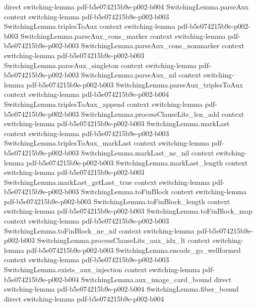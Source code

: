 \begin{lemma}
  {direct}
  {switching-lemma}
  {pdf-b5e074215b9e-p002-b004}
\proofstep
  {SwitchingLemma.parseAux}
  {context}
  {switching-lemma}
  {pdf-b5e074215b9e-p002-b003}
\proofstep
  {SwitchingLemma.triplesToAux}
  {context}
  {switching-lemma}
  {pdf-b5e074215b9e-p002-b003}
\proofstep
  {SwitchingLemma.parseAux_cons_marker}
  {context}
  {switching-lemma}
  {pdf-b5e074215b9e-p002-b003}
\proofstep
  {SwitchingLemma.parseAux_cons_nonmarker}
  {context}
  {switching-lemma}
  {pdf-b5e074215b9e-p002-b003}
\proofstep
  {SwitchingLemma.parseAux_singleton}
  {context}
  {switching-lemma}
  {pdf-b5e074215b9e-p002-b003}
\proofstep
  {SwitchingLemma.parseAux_nil}
  {context}
  {switching-lemma}
  {pdf-b5e074215b9e-p002-b003}
\proofstep
  {SwitchingLemma.parseAux_triplesToAux}
  {context}
  {switching-lemma}
  {pdf-b5e074215b9e-p002-b004}
\proofstep
  {SwitchingLemma.triplesToAux_append}
  {context}
  {switching-lemma}
  {pdf-b5e074215b9e-p002-b003}
\proofstep
  {SwitchingLemma.processClauseLits_len_add}
  {context}
  {switching-lemma}
  {pdf-b5e074215b9e-p002-b003}
\proofstep
  {SwitchingLemma.markLast}
  {context}
  {switching-lemma}
  {pdf-b5e074215b9e-p002-b003}
\proofstep
  {SwitchingLemma.triplesToAux_markLast}
  {context}
  {switching-lemma}
  {pdf-b5e074215b9e-p002-b003}
\proofstep
  {SwitchingLemma.markLast_ne_nil}
  {context}
  {switching-lemma}
  {pdf-b5e074215b9e-p002-b003}
\proofstep
  {SwitchingLemma.markLast_length}
  {context}
  {switching-lemma}
  {pdf-b5e074215b9e-p002-b003}
\proofstep
  {SwitchingLemma.markLast_getLast_true}
  {context}
  {switching-lemma}
  {pdf-b5e074215b9e-p002-b003}
\proofstep
  {SwitchingLemma.toFinBlock}
  {context}
  {switching-lemma}
  {pdf-b5e074215b9e-p002-b003}
\proofstep
  {SwitchingLemma.toFinBlock_length}
  {context}
  {switching-lemma}
  {pdf-b5e074215b9e-p002-b003}
\proofstep
  {SwitchingLemma.toFinBlock_map}
  {context}
  {switching-lemma}
  {pdf-b5e074215b9e-p002-b003}
\proofstep
  {SwitchingLemma.toFinBlock_ne_nil}
  {context}
  {switching-lemma}
  {pdf-b5e074215b9e-p002-b003}
\proofstep
  {SwitchingLemma.processClauseLits_aux_idx_lt}
  {context}
  {switching-lemma}
  {pdf-b5e074215b9e-p002-b003}
\proofstep
  {SwitchingLemma.encode_go_wellformed}
  {context}
  {switching-lemma}
  {pdf-b5e074215b9e-p002-b003}
\proofstep
  {SwitchingLemma.exists_aux_injection}
  {context}
  {switching-lemma}
  {pdf-b5e074215b9e-p002-b004}
\proofstep
  {SwitchingLemma.aux_image_card_bound}
  {direct}
  {switching-lemma}
  {pdf-b5e074215b9e-p002-b004}
\proofstep
  {SwitchingLemma.fiber_bound}
  {direct}
  {switching-lemma}
  {pdf-b5e074215b9e-p002-b004}

\end{lemma}
